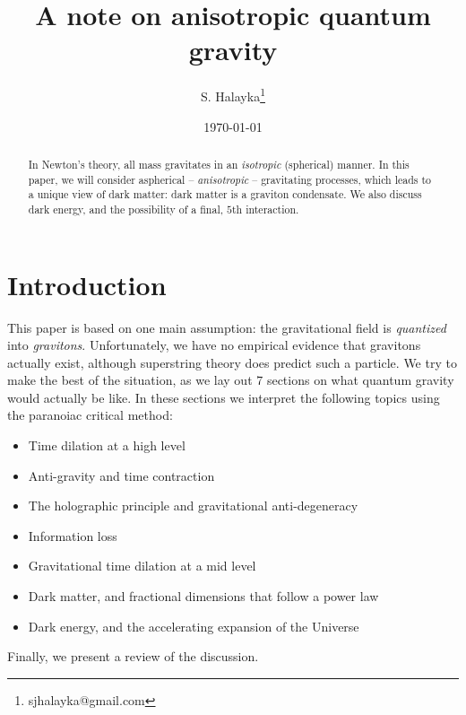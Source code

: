 \documentclass[12pt]{article}
\title{A note on anisotropic quantum gravity}
\author{S. Halayka\footnote{sjhalayka@gmail.com}}
\date{\today\;\currenttime}
\begin{document}
 
\maketitle

\begin{abstract}
In Newton's theory, all mass gravitates in an {\textit{isotropic}} (spherical) manner.
In this paper, we will consider aspherical -- {\textit{anisotropic}} -- gravitating processes, which leads to a unique view of dark matter: dark matter is a graviton condensate.
We also discuss dark energy, and the possibility of a final, $5$th interaction.
\end{abstract}





\section{Introduction}

This paper is based on one main assumption: the gravitational field is {\textit{quantized}} into {\textit{gravitons}}.
Unfortunately, we have no empirical evidence that gravitons actually exist, although superstring theory \cite{wray} does predict such a particle.
We try to make the best of the situation, as we lay out 7 sections on what quantum gravity would actually be like.
In these sections we interpret the following topics using the paranoiac critical method:
\begin{itemize}
\item Time dilation at a high level
\item Anti-gravity and time contraction
\item The holographic principle and gravitational anti-degeneracy
\item Information loss
\item Gravitational time dilation at a mid level
\item Dark matter, and fractional dimensions that follow a power law
\item Dark energy, and the accelerating expansion of the Universe
\end{itemize}

Finally, we present a review of the discussion.

\end{document}
